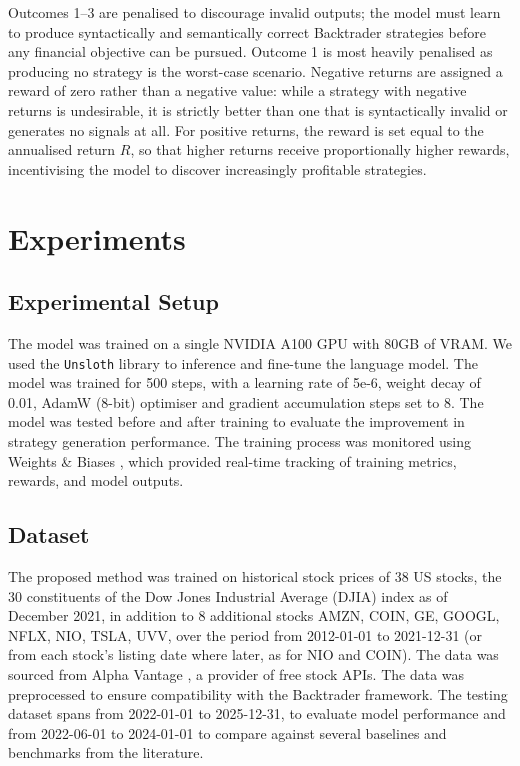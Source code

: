 \documentclass[conference]{IEEEtran}
\begin{document}
Outcomes 1--3 are penalised to discourage invalid outputs; the model must learn
to produce syntactically and semantically correct Backtrader strategies before any
financial objective can be pursued. Outcome 1 is most heavily penalised as producing
no strategy is the worst-case scenario.
Negative returns are assigned a reward of zero rather than a negative value: while a strategy with negative returns is undesirable, it
is strictly better than one that is syntactically invalid or generates no signals at
all. For positive returns, the reward is set equal to the annualised return $R$, so that
higher returns receive proportionally higher rewards, incentivising the model to
discover increasingly profitable strategies.

\section{Experiments}
\label{ch:experiments}

\subsection{Experimental Setup}
The model was trained on a single NVIDIA A100 GPU with 80GB of VRAM. We used the \texttt{Unsloth} library \cite{unsloth2024} to inference and
fine-tune the language model. The model was trained for 500 steps, with a learning rate of 5e-6, weight decay of 0.01,
AdamW (8-bit) optimiser and gradient accumulation steps set to 8. The model was tested before and after training to evaluate the improvement in strategy generation performance.
The training process was monitored using Weights \& Biases \cite{wandb2024}, which provided real-time tracking of training metrics, rewards, and model outputs.

\subsection{Dataset}
The proposed method was trained on historical stock prices of 38 US stocks,
the 30 constituents of the Dow Jones Industrial Average (DJIA) index as of December 2021,
in addition to 8 additional stocks AMZN, COIN, GE, GOOGL, NFLX, NIO, TSLA, UVV, over the period from 2012-01-01 to 2021-12-31 (or from each stock's listing date where later, as for NIO and COIN).
The data was sourced from Alpha Vantage \cite{alphavantage2024}, a provider of free stock APIs.
The data was preprocessed to ensure compatibility with the Backtrader framework.
The testing dataset spans from 2022-01-01 to 2025-12-31, to evaluate model performance and from 2022-06-01 to 2024-01-01 to compare against several baselines and benchmarks from the literature.
\end{document}
